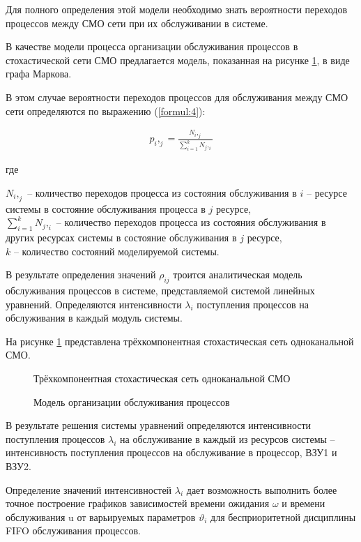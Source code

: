 Для полного определения этой модели необходимо знать вероятности переходов процессов между СМО сети при их обслуживании в системе. 

В качестве модели процесса организации обслуживания процессов в стохастической сети СМО предлагается модель, показанная на рисунке \ref{img:3}, в виде графа Маркова. 

В этом случае вероятности переходов процессов для обслуживания между СМО сети определяются по выражению (\ref{formul:4}):

\begin{align}
	p_i,_j = \frac{N_i,_j}{\sum_{i=1}^{k}N_j,_i} 
	\label{formul:4}
\end{align}

где

$N_i,_j$ -- количество переходов процесса из состояния обслуживания в $i$ -- ресурсе системы в состояние обслуживания процесса в $j$ ресурсе, \\
$\sum_{i=1}^{k}N_j,_i$ -- количество переходов процесса из состояния обслуживания в
других ресурсах системы в состояние обслуживания в $j$ ресурсе, \\
$k$ -- количество состояний моделируемой системы.

В результате определения значений $\rho_{ij}$ троится аналитическая модель обслуживания процессов в системе, представляемой системой линейных уравнений. Определяются интенсивности $\lambda_i$ поступления процессов на обслуживания в каждый модуль системы.

На рисунке \ref{img:3} представлена трёхкомпонентная стохастическая сеть одноканальной СМО. 

\begin{figure}[H]
	\renewcommand{\figurename}{Рисунок}
	\caption{Трёхкомпонентная стохастическая сеть одноканальной СМО }
	\label{img:3}
\end{figure}

\begin{figure}[H]
	\renewcommand{\figurename}{Рисунок}
	\caption{Модель организации обслуживания процессов }
	\label{img:4}
\end{figure}

В результате решения системы уравнений определяются интенсивности поступления процессов $\lambda_i$ на обслуживание в каждый из ресурсов системы – интенсивность поступления процессов на обслуживание в процессор, ВЗУ1 и ВЗУ2.

Определение значений интенсивностей $\lambda_i$ дает возможность выполнить более точное построение графиков зависимостей времени ожидания $\omega$ и времени обслуживания u от варьируемых параметров $\vartheta_i$ для бесприоритетной дисциплины FIFO обслуживания процессов.



